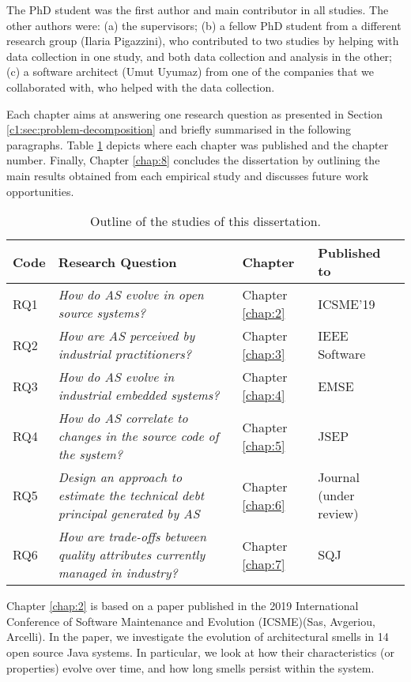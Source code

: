 The PhD student was the first author and main contributor in all studies. The other authors were: (a) the supervisors; (b) a fellow PhD student from a different research group (Ilaria Pigazzini), who contributed to two studies by helping with data collection in one study, and both data collection and analysis in the other; (c) a software architect (Umut Uyumaz) from one of the companies that we collaborated with, who helped with the data collection.

Each chapter aims at answering one research question as presented in Section \ref{c1:sec:problem-decomposition} and briefly summarised in the following paragraphs.
Table \ref{c1:tab:outline} depicts where each chapter was published and the chapter number.
Finally, Chapter \ref{chap:8} concludes the dissertation by outlining the main results obtained from each empirical study and discusses future work opportunities.

\begin{table}[]
    \centering
    \caption{Outline of the studies of this dissertation.}
    \label{c1:tab:outline}
    \begin{tabular}{lm{6.5cm}lm{2cm}}
    \hline
    \textbf{Code} & \textbf{Research Question} & \textbf{Chapter} & \textbf{Published to} \\ \hline
    RQ1 & \textit{How do AS evolve in open source systems?} &  Chapter \ref{chap:2} & ICSME'19 \\
    RQ2 & \textit{How are AS perceived by industrial practitioners?} & Chapter \ref{chap:3} & IEEE Software \\
    RQ3 & \textit{How do AS evolve in industrial embedded systems?} &  Chapter \ref{chap:4} & EMSE \\
    RQ4 & \textit{How do AS correlate to changes in the source code of the system?} &  Chapter \ref{chap:5} & JSEP \\
    RQ5 & \textit{Design an approach to estimate the technical debt principal generated by AS} & Chapter \ref{chap:6} & Journal (under review) \\
    RQ6 & \textit{How are trade-offs between quality attributes currently managed in industry?} & Chapter \ref{chap:7} & SQJ \\ \hline
    \end{tabular}
\end{table}

Chapter \ref{chap:2} is based on a paper published in the 2019 International Conference of Software Maintenance and Evolution (ICSME)(Sas, Avgeriou, Arcelli).
In the paper, we investigate the evolution of architectural smells in 14 open source Java systems.
In particular, we look at how their characteristics (or properties) evolve over time, and how long smells persist within the system. 

